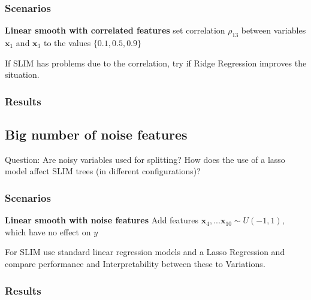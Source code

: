 \subsubsection{Scenarios}

\textbf{Linear smooth with correlated features} set correlation $\rho_{13}$ between  variables $\textbf{x}_1$ and $\textbf{x}_3$ to the values $\{0.1, 0.5, 0.9\}$

If SLIM has problems due to the correlation, try if Ridge Regression improves the situation.

\subsubsection{Results}


\subsection{Big number of noise features}
Question: Are noisy variables used for splitting? How does the use of a lasso model affect SLIM trees (in different configurations)?
\subsubsection{Scenarios}
\textbf{Linear smooth with noise features}
Add features $\textbf{x}_{4}, ... \textbf{x}_{10} \sim U(-1,1)$, which have no effect on $y$

For SLIM use standard linear regression models and a Lasso Regression and compare performance and Interpretability between these to Variations.

\subsubsection{Results}


